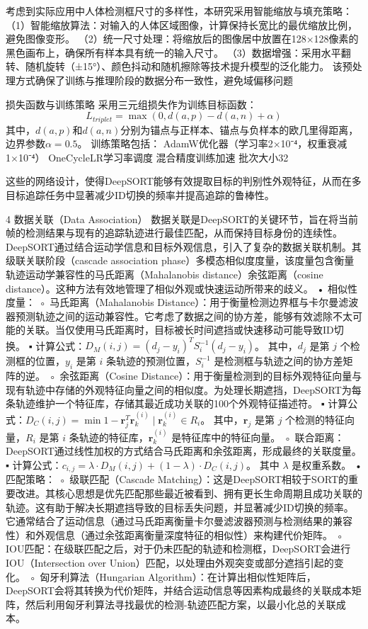 考虑到实际应用中人体检测框尺寸的多样性，本研究采用智能缩放与填充策略：
    （1）智能缩放算法：对输入的人体区域图像，计算保持长宽比的最优缩放比例，避免图像变形。
    （2）统一尺寸处理：将缩放后的图像居中放置在128×128像素的黑色画布上，确保所有样本具有统一的输入尺寸。
    （3）数据增强：采用水平翻转、随机旋转（±15°）、颜色抖动和随机擦除等技术提升模型的泛化能力。
    该预处理方式确保了训练与推理阶段的数据分布一致性，避免域偏移问题


损失函数与训练策略
采用三元组损失作为训练目标函数：
$$L_{triplet} = \max(0, d(a,p) - d(a,n) + \alpha)$$
其中，$d(a,p)$和$d(a,n)$分别为锚点与正样本、锚点与负样本的欧几里得距离，边界参数$\alpha=0.5$。
训练策略包括：
AdamW优化器（学习率2×10⁻⁴，权重衰减1×10⁻⁴）
OneCycleLR学习率调度
混合精度训练加速
批次大小32


这些的网络设计，使得DeepSORT能够有效提取目标的判别性外观特征，从而在多目标追踪任务中显著减少ID切换的频率并提高追踪的鲁棒性。


4 数据关联（Data Association）
数据关联是DeepSORT的关键环节，旨在将当前帧的检测结果与现有的追踪轨迹进行最佳匹配，从而保持目标身份的连续性。DeepSORT通过结合运动学信息和目标外观信息，引入了复杂的数据关联机制。其级联关联阶段（cascade association phase）多模态相似度度量，该度量包含衡量轨迹运动学兼容性的马氏距离（Mahalanobis distance）余弦距离（cosine distance）。这种方法有效地管理了相似外观或快速运动所带来的歧义\cite{141}。
• 相似性度量：
    ◦ 马氏距离（Mahalanobis Distance）：用于衡量检测边界框与卡尔曼滤波器预测轨迹之间的运动兼容性。它考虑了数据之间的协方差，能够有效滤除不太可能的关联。当仅使用马氏距离时，目标被长时间遮挡或快速移动可能导致ID切换。
        ▪ 计算公式：$D_M(i, j) = (d_j - y_i)^T S_i^{-1} (d_j - y_i)$。 其中，$d_j$ 是第 $j$ 个检测框的位置，$y_i$ 是第 $i$ 条轨迹的预测位置，$S_i^{-1}$ 是检测框与轨迹之间的协方差矩阵的逆\cite{105}。
    ◦ 余弦距离（Cosine Distance）：用于衡量检测到的目标外观特征向量与现有轨迹中存储的外观特征向量之间的相似度。为处理长期遮挡，DeepSORT为每条轨迹维护一个特征库，存储其最近成功关联的100个外观特征描述符。
        ▪ 计算公式：$D_C(i, j) = \min {1 - \mathbf{r}_j^T \mathbf{r}_k^{(i)} \mid \mathbf{r}_k^{(i)} \in R_i }$。 其中，$\mathbf{r}_j$ 是第 $j$ 个检测的特征向量，$R_i$ 是第 $i$ 条轨迹的特征库，$\mathbf{r}_k^{(i)}$ 是特征库中的特征向量\cite{105}。
    ◦ 联合距离：DeepSORT通过线性加权的方式结合马氏距离和余弦距离，形成最终的关联度量。
        ▪ 计算公式：$c_{i,j} = \lambda \cdot D_M(i,j) + (1 - \lambda) \cdot D_C(i,j)$。 其中 $\lambda$ 是权重系数\cite{105}。
• 匹配策略：
    ◦ 级联匹配（Cascade Matching）：这是DeepSORT相较于SORT的重要改进。其核心思想是优先匹配那些最近被看到、拥有更长生命周期且成功关联的轨迹。这有助于解决长期遮挡导致的目标丢失问题，并显著减少ID切换的频率\cite{134}。它通常结合了运动信息（通过马氏距离衡量卡尔曼滤波器预测与检测结果的兼容性）和外观信息（通过余弦距离衡量深度特征的相似性）来构建代价矩阵。
    ◦ IOU匹配：在级联匹配之后，对于仍未匹配的轨迹和检测框，DeepSORT会进行IOU（Intersection over Union）匹配，以处理由外观突变或部分遮挡引起的变化。
    ◦ 匈牙利算法（Hungarian Algorithm）：在计算出相似性矩阵后，DeepSORT会将其转换为代价矩阵，并结合运动信息等因素构成最终的关联成本矩阵，然后利用匈牙利算法寻找最优的检测-轨迹匹配方案，以最小化总的关联成本\cite{103}。
 
